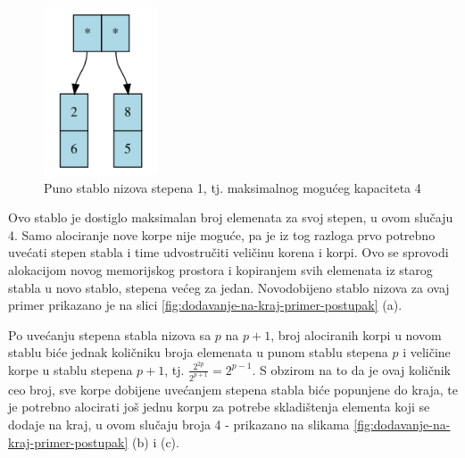 \documentclass[a4paper]{article}
\begin{document}
\begin{figure}[h!]
    \centering
    \includegraphics[width=0.3\textwidth]{ilustracije/dodavanje-na-kraj-primer-1.png}
    \caption{Puno stablo nizova stepena 1, tj. maksimalnog mogućeg kapaciteta 4}
    \label{fig:dodavanje-na-kraj-primer-pocetak}
\end{figure}

Ovo stablo je dostiglo maksimalan broj elemenata za svoj stepen, u ovom slučaju 4. Samo alociranje nove korpe nije moguće, pa je iz tog razloga prvo potrebno uvećati stepen stabla i time udvostručiti veličinu korena i korpi. Ovo se sprovodi alokacijom novog memorijskog prostora i kopiranjem svih elemenata iz starog stabla u novo stablo, stepena većeg za jedan. Novodobijeno stablo nizova za ovaj primer prikazano je na slici \ref{fig:dodavanje-na-kraj-primer-postupak} (a).

Po uvećanju stepena stabla nizova sa $p$ na $p + 1$, broj alociranih korpi u novom stablu biće jednak količniku broja elemenata u punom stablu stepena $p$ i veličine korpe u stablu stepena $p + 1$, tj. $\frac{2^{2p}}{2^{p + 1}} = 2^{p - 1}$. S obzirom na to da je ovaj količnik ceo broj, sve korpe dobijene uvećanjem stepena stabla biće popunjene do kraja, te je potrebno alocirati još jednu korpu za potrebe skladištenja elementa koji se dodaje na kraj, u ovom slučaju broja 4 - prikazano na slikama \ref{fig:dodavanje-na-kraj-primer-postupak} (b) i (c).
\end{document}
